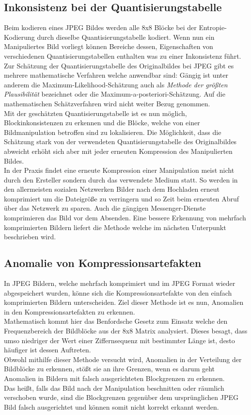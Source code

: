 \subsection{Inkonsistenz bei der Quantisierungstabelle}
Beim kodieren eines JPEG Bildes werden alle 8x8 Blöcke bei der Entropie-Kodierung durch dieselbe Quantisierungstabelle kodiert. Wenn nun ein Manipuliertes Bild vorliegt können Bereiche dessen, Eigenschaften von verschiedenen Quantisierungstabellen enthalten was zu einer Inkonsistenz führt. Zur Schätzung der Quantisierungstabelle des Originalbildes bei JPEG gibt es mehrere mathematische Verfahren welche anwendbar sind: Gängig ist unter anderem die Maximum-Likelihood-Schätzung auch als \emph{Methode der größten Plausibilität} bezeichnet oder die Maximum-a-posteriori-Schätzung.\cite{Chen2011} Auf die mathematischen Schätzverfahren wird nicht weiter Bezug genommen.\\
Mit der geschätzten Quantisierungstabelle ist es nun möglich, Blockinkonsistenzen zu erkennen und die Blöcke, welche von einer Bildmanipulation betroffen sind zu lokalisieren. Die Möglichkeit, dass die Schätzung stark von der verwendeten Quantisierungstabelle des Originalbildes abweicht erhöht sich aber mit jeder erneuten Kompression des Manipulierten Bildes.\\
In der Praxis findet eine erneute Kompression einer Manipulation meist nicht durch den Ersteller sondern durch das verwendete Medium statt. So werden in den allermeisten sozialen Netzwerken Bilder nach dem Hochladen erneut komprimiert um die Dateigröße zu verringern und so Zeit beim erneuten Abruf über das Netzwerk zu sparen. Auch die gängigen Messenger-Dienste komprimieren das Bild vor dem Absenden. Eine bessere Erkennung von mehrfach komprimierten Bildern liefert die Methode welche im nächsten Unterpunkt beschrieben wird.

\subsection{Anomalie von Kompressionsartefakten}
In JPEG Bildern, welche mehrfach komprimiert und im JPEG Format wieder abgespeichert wurden, könne sich die Kompressionsartefakte von den einfach komprimierten Bildern unterscheiden. Ziel dieser Methode ist es nun, Anomalien in den Kompressionsartefakten zu erkennen.\\
Mathematisch kommt hier das Benfordsche Gesetz zum Einsatz welche den Frequenzbereich der Bildblöcke aus der 8x8 Matrix analysiert.\cite{Chen2011} Dieses besagt, dass umso niedriger der Wert einer Ziffernsequenz mit bestimmter Länge ist, desto häufiger ist dessen Auftreten.\cite{WikiBenford}\\
Obwohl mithilfe dieser Methode versucht wird, Anomalien in der Verteilung der Bildblöcke zu erkennen, stößt sie an ihre Grenzen, wenn es darum geht Anomalien in Bildern mit falsch ausgerichteten Blockgrenzen zu erkennen.\\
Das heißt, falls das Bild nach der Manipulation beschnitten oder räumlich verschoben wurde, sind die Blockgrenzen gegenüber dem ursprünglichen JPEG Bild falsch ausgerichtet und können somit nicht korrekt erkannt werden.

